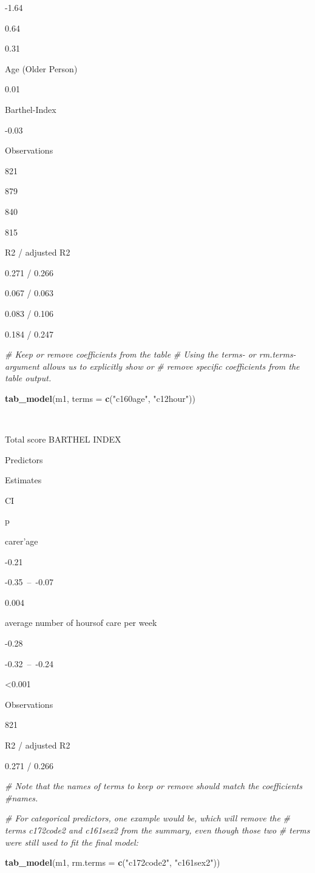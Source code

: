 \documentclass[]{article}
\newenvironment{Shaded}{\begin{snugshade}}{\end{snugshade}}
\newcommand{\KeywordTok}[1]{\textcolor[rgb]{0.13,0.29,0.53}{\textbf{#1}}}
\newcommand{\DataTypeTok}[1]{\textcolor[rgb]{0.13,0.29,0.53}{#1}}
\newcommand{\StringTok}[1]{\textcolor[rgb]{0.31,0.60,0.02}{#1}}
\newcommand{\CommentTok}[1]{\textcolor[rgb]{0.56,0.35,0.01}{\textit{#1}}}
\newcommand{\NormalTok}[1]{#1}
\begin{document}
-1.64

0.64

0.31

Age (Older Person)

0.01

Barthel-Index

-0.03

Observations

821

879

840

815

R2 / adjusted R2

0.271 / 0.266

0.067 / 0.063

0.083 / 0.106

0.184 / 0.247

\begin{Shaded}
\begin{Highlighting}[]
\CommentTok{# Keep or remove coefficients from the table}
\CommentTok{# Using the terms- or rm.terms-argument allows us to explicitly show or }
\CommentTok{# remove specific coefficients from the table output.}

\KeywordTok{tab_model}\NormalTok{(m1, }\DataTypeTok{terms =} \KeywordTok{c}\NormalTok{(}\StringTok{"c160age"}\NormalTok{, }\StringTok{"c12hour"}\NormalTok{))}
\end{Highlighting}
\end{Shaded}

~

Total score BARTHEL INDEX

Predictors

Estimates

CI

p

carer'age

-0.21

-0.35~--~-0.07

0.004

average number of hoursof care per week

-0.28

-0.32~--~-0.24

\textless{}0.001

Observations

821

R2 / adjusted R2

0.271 / 0.266

\begin{Shaded}
\begin{Highlighting}[]
\CommentTok{# Note that the names of terms to keep or remove should match the coefficients}
\CommentTok{#names. }

\CommentTok{# For categorical predictors, one example would be, which will remove the}
\CommentTok{# terms c172code2 and c161sex2 from the summary, even though those two}
\CommentTok{# terms were still used to fit the final model:}

\KeywordTok{tab_model}\NormalTok{(m1, }\DataTypeTok{rm.terms =} \KeywordTok{c}\NormalTok{(}\StringTok{"c172code2"}\NormalTok{, }\StringTok{"c161sex2"}\NormalTok{))}
\end{Highlighting}
\end{Shaded}
\end{document}
